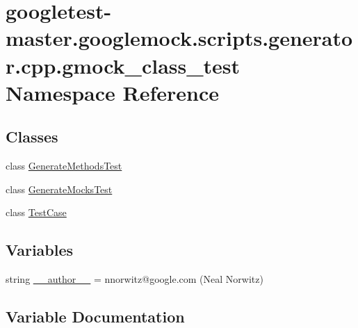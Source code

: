 \hypertarget{namespacegoogletest-master_1_1googlemock_1_1scripts_1_1generator_1_1cpp_1_1gmock__class__test}{}\section{googletest-\/master.googlemock.\+scripts.\+generator.\+cpp.\+gmock\+\_\+class\+\_\+test Namespace Reference}
\label{namespacegoogletest-master_1_1googlemock_1_1scripts_1_1generator_1_1cpp_1_1gmock__class__test}
\subsection*{Classes}
\begin{DoxyCompactItemize}
\item 
class \mbox{\hyperlink{classgoogletest-master_1_1googlemock_1_1scripts_1_1generator_1_1cpp_1_1gmock__class__test_1_1_generate_methods_test}{Generate\+Methods\+Test}}
\item 
class \mbox{\hyperlink{classgoogletest-master_1_1googlemock_1_1scripts_1_1generator_1_1cpp_1_1gmock__class__test_1_1_generate_mocks_test}{Generate\+Mocks\+Test}}
\item 
class \mbox{\hyperlink{classgoogletest-master_1_1googlemock_1_1scripts_1_1generator_1_1cpp_1_1gmock__class__test_1_1_test_case}{Test\+Case}}
\end{DoxyCompactItemize}
\subsection*{Variables}
\begin{DoxyCompactItemize}
\item 
string \mbox{\hyperlink{namespacegoogletest-master_1_1googlemock_1_1scripts_1_1generator_1_1cpp_1_1gmock__class__test_af095836428da5014d050eea22949cafa}{\+\_\+\+\_\+author\+\_\+\+\_\+}} = \textquotesingle{}nnorwitz@google.\+com (Neal Norwitz)\textquotesingle{}
\end{DoxyCompactItemize}


\subsection{Variable Documentation}
\mbox{\label{namespacegoogletest-master_1_1googlemock_1_1scripts_1_1generator_1_1cpp_1_1gmock__class__test_af095836428da5014d050eea22949cafa}} 
